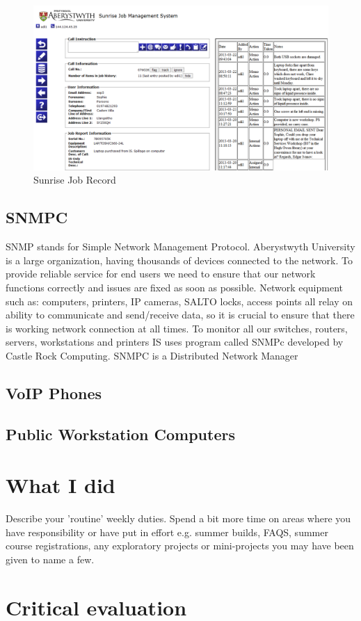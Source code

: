 \documentclass[10pt,a4paper,headinclude=true]{report}
\begin{document}
\begin{figure}[H]
\centering
\centerline{\includegraphics[scale=0.5]{./sunrise_job}}
\caption{Sunrise Job Record}
\label{fig:sunrise_job}
\end{figure}

\section{SNMPC}
SNMP stands for Simple Network Management Protocol. Aberystwyth University is a large organization, having thousands of devices connected to the network. To provide reliable service for end users we need to ensure that our network functions correctly and issues are fixed as soon as possible. Network equipment such as: computers, printers, IP cameras, SALTO locks, access points all relay on ability to communicate and send/receive data, so it is crucial to ensure that there is working network connection at all times. To monitor all our switches, routers, servers, workstations and printers IS uses program called SNMPc developed by Castle Rock Computing. SNMPC is a Distributed Network Manager \cite{SNMPc}

\section{VoIP Phones}
\section{Public Workstation Computers}

\chapter{What I did}
Describe your 'routine' weekly duties. Spend a bit more time on areas where you have
responsibility or have put in effort e.g. summer builds, FAQS, summer course
registrations, any exploratory projects or mini-projects you may have been given to
name a few.

\chapter{Critical evaluation}


\end{document}
